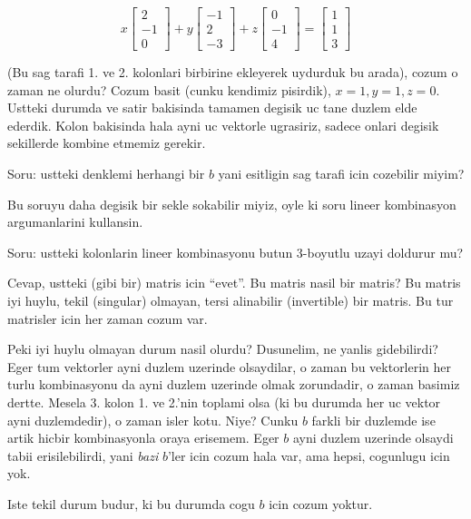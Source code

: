\documentclass[12pt,fleqn]{article}\usepackage{../common}
\begin{document}
$$ 
x 
\left[\begin{array}{r}
2 \\
-1 \\
0
\end{array}\right]
+
y
\left[\begin{array}{r}
-1 \\
2 \\
-3
\end{array}\right]
+
z 
\left[\begin{array}{r}
0 \\
-1 \\
4
\end{array}\right]
=
\left[\begin{array}{r}
1 \\
1 \\
3
\end{array}\right]
 $$

(Bu sag tarafi 1. ve 2. kolonlari birbirine ekleyerek uydurduk bu arada),
cozum o zaman ne olurdu? Cozum basit (cunku kendimiz pisirdik),
$x=1,y=1,z=0$. Ustteki durumda ve satir bakisinda tamamen degisik uc tane
duzlem elde ederdik. Kolon bakisinda hala ayni uc vektorle ugrasiriz,
sadece onlari degisik sekillerde kombine etmemiz gerekir. 

Soru: ustteki denklemi herhangi bir $b$ yani esitligin sag tarafi icin
cozebilir miyim? 

Bu soruyu daha degisik bir sekle sokabilir miyiz, oyle ki soru lineer
kombinasyon argumanlarini kullansin. 

Soru: ustteki kolonlarin lineer kombinasyonu butun 3-boyutlu uzayi doldurur
mu?

Cevap, ustteki (gibi bir) matris icin ``evet''. Bu matris nasil bir matris?
Bu matris iyi huylu, tekil (singular) olmayan, tersi alinabilir
(invertible) bir matris. Bu tur matrisler icin her zaman cozum var. 

Peki iyi huylu olmayan durum nasil olurdu? Dusunelim, ne yanlis
gidebilirdi? Eger tum vektorler ayni duzlem uzerinde olsaydilar, o zaman bu
vektorlerin her turlu kombinasyonu da ayni duzlem uzerinde olmak
zorundadir, o zaman basimiz dertte. Mesela 3. kolon 1. ve 2.'nin toplami
olsa (ki bu durumda her uc vektor ayni duzlemdedir), o zaman isler
kotu. Niye? Cunku $b$ farkli bir duzlemde ise artik hicbir kombinasyonla
oraya erisemem. Eger $b$ ayni duzlem uzerinde olsaydi tabii erisilebilirdi,
yani {\em bazi} $b$'ler icin cozum hala var, ama hepsi, cogunlugu icin yok. 

Iste tekil durum budur, ki bu durumda cogu $b$ icin cozum yoktur.
\end{document}

